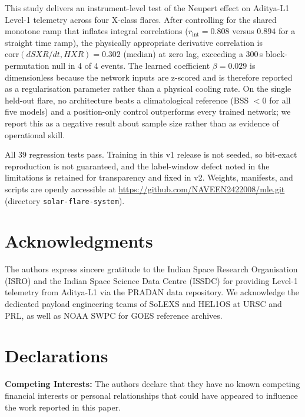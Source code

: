 \documentclass[11pt,a4paper,twocolumn]{article}
\newcommand{\rint}{0.808}
\newcommand{\rdiff}{0.302}
\newcommand{\rintramp}{0.894}
\begin{document}
This study delivers an instrument-level test of the Neupert effect on Aditya-L1 Level-1 telemetry across four X-class flares. After controlling for the shared monotone ramp that inflates integral correlations ($r_{\mathrm{int}} = \rint$ versus $\rintramp$ for a straight time ramp), the physically appropriate derivative correlation is $\mathrm{corr}(dSXR/dt, HXR) = \rdiff$ (median) at zero lag, exceeding a 300\,s block-permutation null in 4 of 4 events. The learned coefficient $\beta = 0.029$ is dimensionless because the network inputs are z-scored and is therefore reported as a regularisation parameter rather than a physical cooling rate. On the single held-out flare, no architecture beats a climatological reference (BSS $< 0$ for all five models) and a position-only control outperforms every trained network; we report this as a negative result about sample size rather than as evidence of operational skill.

All 39 regression tests pass. Training in this v1 release is not seeded, so bit-exact reproduction is not guaranteed, and the label-window defect noted in the limitations is retained for transparency and fixed in v2. Weights, manifests, and scripts are openly accessible at \url{https://github.com/NAVEEN2422008/mle.git} (directory \texttt{solar-flare-system}).

\section*{Acknowledgments}
\noindent The authors express sincere gratitude to the Indian Space Research Organisation (ISRO) and the Indian Space Science Data Centre (ISSDC) for providing Level-1 telemetry from Aditya-L1 via the PRADAN data repository. We acknowledge the dedicated payload engineering teams of SoLEXS and HEL1OS at URSC and PRL, as well as NOAA SWPC for GOES reference archives.

\section*{Declarations}
\noindent \textbf{Competing Interests:} The authors declare that they have no known competing financial interests or personal relationships that could have appeared to influence the work reported in this paper.
\end{document}
